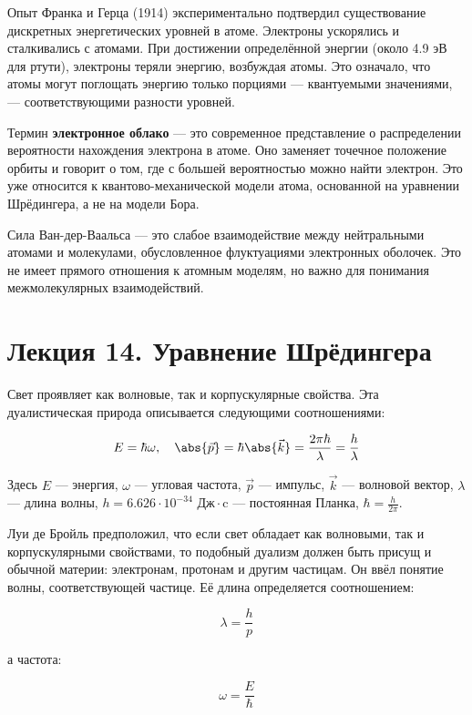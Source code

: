 \documentclass[12pt]{article}
\begin{document}
Опыт Франка и Герца (1914) экспериментально подтвердил существование дискретных энергетических уровней в атоме. Электроны ускорялись и сталкивались с атомами. При достижении определённой энергии (около 4.9 эВ для ртути), электроны теряли энергию, возбуждая атомы. Это означало, что атомы могут поглощать энергию только порциями — квантуемыми значениями, — соответствующими разности уровней.

Термин \textbf{электронное облако} — это современное представление о распределении вероятности нахождения электрона в атоме. Оно заменяет точечное положение орбиты и говорит о том, где с большей вероятностью можно найти электрон. Это уже относится к квантово-механической модели атома, основанной на уравнении Шрёдингера, а не на модели Бора.

Сила Ван-дер-Ваальса — это слабое взаимодействие между нейтральными атомами и молекулами, обусловленное флуктуациями электронных оболочек. Это не имеет прямого отношения к атомным моделям, но важно для понимания межмолекулярных взаимодействий.






\section{Лекция 14. Уравнение Шрёдингера}

Свет проявляет как волновые, так и корпускулярные свойства. Эта дуалистическая природа описывается следующими соотношениями:

\[
E = \hbar \omega, \quad \abs{\vec{p}} = \hbar \abs{\vec{k}} = \frac{2\pi \hbar}{\lambda} = \frac{h}{\lambda}
\]

Здесь $E$ — энергия, $\omega$ — угловая частота, $\vec{p}$ — импульс, $\vec{k}$ — волновой вектор, $\lambda$ — длина волны, $h = 6.626 \cdot 10^{-34} \text{ Дж}\cdot\text{c}$ — постоянная Планка, $\hbar = \frac{h}{2\pi}$.

Луи де Бройль предположил, что если свет обладает как волновыми, так и корпускулярными свойствами, то подобный дуализм должен быть присущ и обычной материи: электронам, протонам и другим частицам. Он ввёл понятие волны, соответствующей частице. Её длина определяется соотношением:

\[
\lambda = \frac{h}{p}
\]

а частота:

\[
\omega = \frac{E}{\hbar}
\]
\end{document}
